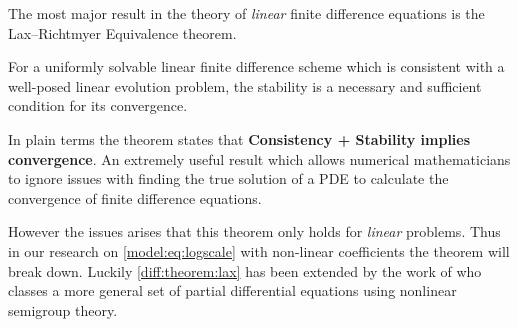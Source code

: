 \documentclass[../main.tex]{subfiles}
\begin{document}
  The most major result in the theory of \emph{linear} finite difference equations is the  Lax–Richtmyer Equivalence theorem.

  \begin{theorem}\label{diff:theorem:lax}
    For a uniformly solvable linear finite difference scheme which is consistent with a well-posed linear evolution problem, the stability is a necessary and sufficient condition for its convergence.
  \end{theorem}

  In plain terms the theorem states that \textbf{Consistency + Stability implies convergence}. An extremely useful result which allows numerical mathematicians to ignore issues with finding the true solution of a PDE to calculate the convergence of finite difference equations.

  However the issues arises that this theorem only holds for \emph{linear} problems. Thus in our research on \autoref{model:eq:logscale} with non-linear coefficients the theorem will break down. Luckily \autoref{diff:theorem:lax} has been extended by the work of \cite{rosinger2008} who classes a more general set of partial differential equations using nonlinear semigroup theory.
\end{document}
